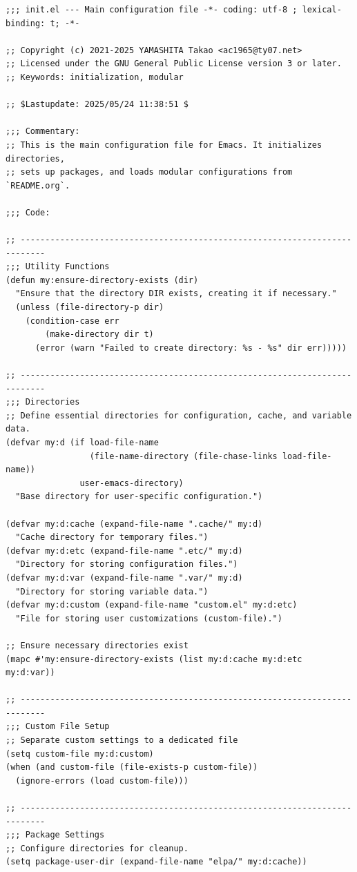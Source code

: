 \documentclass[11pt]{article}
\begin{document}
\begin{verbatim}
;;; init.el --- Main configuration file -*- coding: utf-8 ; lexical-binding: t; -*-

;; Copyright (c) 2021-2025 YAMASHITA Takao <ac1965@ty07.net>
;; Licensed under the GNU General Public License version 3 or later.
;; Keywords: initialization, modular

;; $Lastupdate: 2025/05/24 11:38:51 $

;;; Commentary:
;; This is the main configuration file for Emacs. It initializes directories,
;; sets up packages, and loads modular configurations from `README.org`.

;;; Code:

;; ---------------------------------------------------------------------------
;;; Utility Functions
(defun my:ensure-directory-exists (dir)
  "Ensure that the directory DIR exists, creating it if necessary."
  (unless (file-directory-p dir)
    (condition-case err
        (make-directory dir t)
      (error (warn "Failed to create directory: %s - %s" dir err)))))

;; ---------------------------------------------------------------------------
;;; Directories
;; Define essential directories for configuration, cache, and variable data.
(defvar my:d (if load-file-name
                 (file-name-directory (file-chase-links load-file-name))
               user-emacs-directory)
  "Base directory for user-specific configuration.")

(defvar my:d:cache (expand-file-name ".cache/" my:d)
  "Cache directory for temporary files.")
(defvar my:d:etc (expand-file-name ".etc/" my:d)
  "Directory for storing configuration files.")
(defvar my:d:var (expand-file-name ".var/" my:d)
  "Directory for storing variable data.")
(defvar my:d:custom (expand-file-name "custom.el" my:d:etc)
  "File for storing user customizations (custom-file).")

;; Ensure necessary directories exist
(mapc #'my:ensure-directory-exists (list my:d:cache my:d:etc my:d:var))

;; ---------------------------------------------------------------------------
;;; Custom File Setup
;; Separate custom settings to a dedicated file
(setq custom-file my:d:custom)
(when (and custom-file (file-exists-p custom-file))
  (ignore-errors (load custom-file)))

;; ---------------------------------------------------------------------------
;;; Package Settings
;; Configure directories for cleanup.
(setq package-user-dir (expand-file-name "elpa/" my:d:cache))


\end{verbatim}
\end{document}

